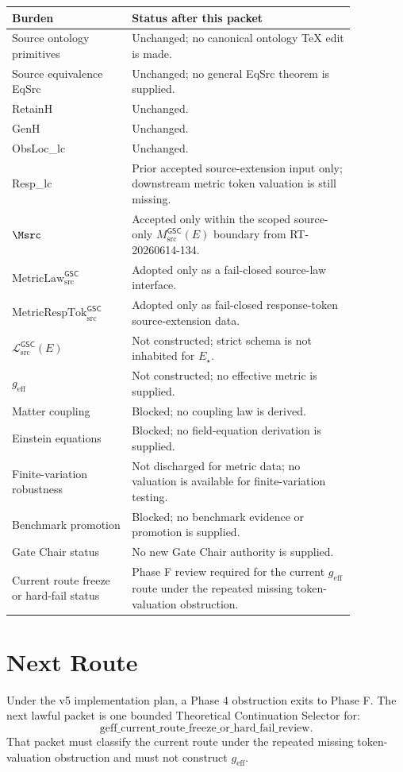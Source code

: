 \documentclass[11pt]{article}
\newcommand{\MsrcGSC}{M_{\mathrm{src}}^{\mathsf{GSC}}}
\newcommand{\MetricLaw}{\mathrm{MetricLaw}_{\mathrm{src}}^{\mathsf{GSC}}}
\newcommand{\MetricRespTok}{\mathrm{MetricRespTok}_{\mathrm{src}}^{\mathsf{GSC}}}
\newcommand{\MetricData}{\mathcal{L}_{\mathrm{src}}^{\mathsf{GSC}}}
\newcommand{\geff}{g_{\mathrm{eff}}}
\begin{document}
\begin{longtable}{p{0.30\linewidth}p{0.56\linewidth}}
\toprule
Burden & Status after this packet \\
\midrule
Source ontology primitives & Unchanged; no canonical ontology TeX edit is made. \\
Source equivalence EqSrc & Unchanged; no general EqSrc theorem is supplied. \\
RetainH & Unchanged. \\
GenH & Unchanged. \\
ObsLoc\_lc & Unchanged. \\
Resp\_lc & Prior accepted source-extension input only; downstream metric token valuation is still missing. \\
\(\Msrc\) & Accepted only within the scoped source-only \(\MsrcGSC(E)\) boundary from RT-20260614-134. \\
\(\MetricLaw\) & Adopted only as a fail-closed source-law interface. \\
\(\MetricRespTok\) & Adopted only as fail-closed response-token source-extension data. \\
\(\MetricData(E)\) & Not constructed; strict schema is not inhabited for \(E_{\star}\). \\
\(\geff\) & Not constructed; no effective metric is supplied. \\
Matter coupling & Blocked; no coupling law is derived. \\
Einstein equations & Blocked; no field-equation derivation is supplied. \\
Finite-variation robustness & Not discharged for metric data; no valuation is available for finite-variation testing. \\
Benchmark promotion & Blocked; no benchmark evidence or promotion is supplied. \\
Gate Chair status & No new Gate Chair authority is supplied. \\
Current route freeze or hard-fail status & Phase F review required for the current \(g_{\mathrm{eff}}\) route under the repeated missing token-valuation obstruction. \\
\bottomrule
\end{longtable}

\section{Next Route}

Under the v5 implementation plan, a Phase 4 obstruction exits to Phase F. The
next lawful packet is one bounded Theoretical Continuation Selector for:
\[
  \mathrm{geff\_current\_route\_freeze\_or\_hard\_fail\_review}.
\]
That packet must classify the current route under the repeated missing
token-valuation obstruction and must not construct \(\geff\).
\end{document}
